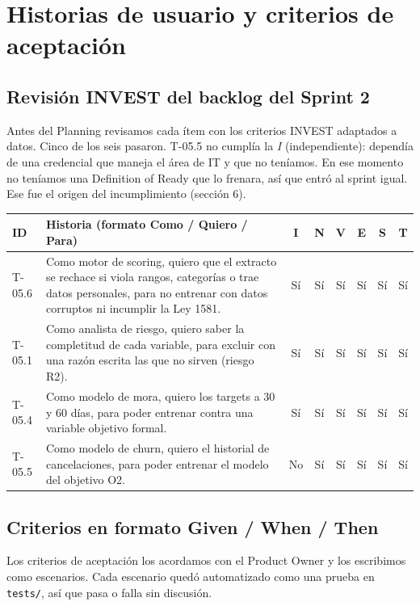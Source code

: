 \documentclass[10pt,a4paper]{article}
\begin{document}
\section{Historias de usuario y criterios de aceptación}
\subsection{Revisión INVEST del backlog del Sprint 2}
Antes del Planning revisamos cada ítem con los criterios INVEST adaptados a datos. Cinco de los seis pasaron.
T-05.5 no cumplía la \emph{I} (independiente): dependía de una credencial que maneja el área de IT y que no
teníamos. En ese momento no teníamos una Definition of Ready que lo frenara, así que entró al sprint igual. Ese fue
el origen del incumplimiento (sección 6).

{\footnotesize
\begin{tabularx}{\linewidth}{@{}l L c c c c c c@{}}
\toprule
ID & Historia (formato Como / Quiero / Para) & I & N & V & E & S & T \\
\midrule
T-05.6 & Como motor de scoring, quiero que el extracto se rechace si viola rangos, categorías o trae datos personales, para no entrenar con datos corruptos ni incumplir la Ley 1581. & Sí & Sí & Sí & Sí & Sí & Sí \\
T-05.1 & Como analista de riesgo, quiero saber la completitud de cada variable, para excluir con una razón escrita las que no sirven (riesgo R2). & Sí & Sí & Sí & Sí & Sí & Sí \\
T-05.4 & Como modelo de mora, quiero los targets a 30 y 60 días, para poder entrenar contra una variable objetivo formal. & Sí & Sí & Sí & Sí & Sí & Sí \\
T-05.5 & Como modelo de churn, quiero el historial de cancelaciones, para poder entrenar el modelo del objetivo O2. & \textcolor{alert}{No} & Sí & Sí & Sí & Sí & Sí \\
\bottomrule
\end{tabularx}}

\subsection{Criterios en formato Given / When / Then}
Los criterios de aceptación los acordamos con el Product Owner y los escribimos como escenarios. Cada escenario
quedó automatizado como una prueba en \texttt{tests/}, así que pasa o falla sin discusión.
\end{document}
